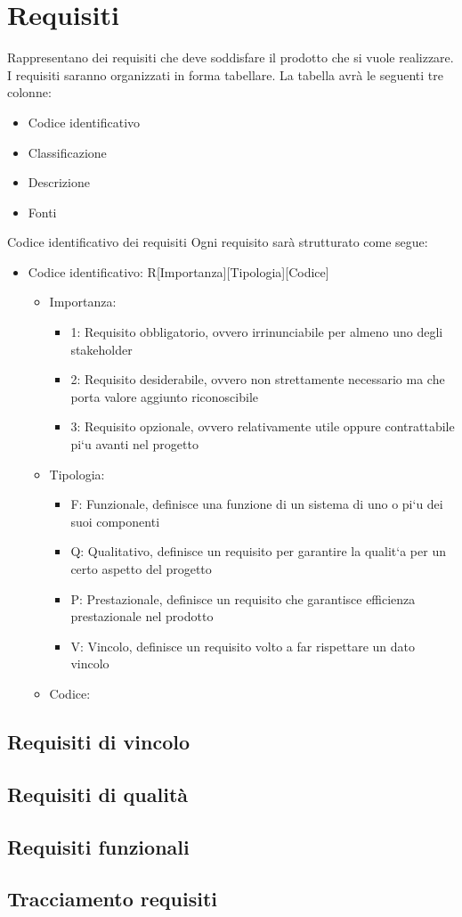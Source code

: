 \section{Requisiti}
    Rappresentano dei requisiti che deve soddisfare il prodotto che si vuole realizzare.
    I requisiti saranno organizzati in forma tabellare.
    La tabella avrà le seguenti tre colonne:
    \begin{itemize}
        \item Codice identificativo
        \item Classificazione
        \item Descrizione
        \item Fonti
    \end{itemize}
    Codice identificativo dei requisiti
    Ogni requisito sarà strutturato come segue:
    \begin{itemize}
        \item Codice identificativo: R[Importanza][Tipologia][Codice]
            \begin{itemize}
                \item Importanza: 
                    \begin{itemize}
                        \item 1: Requisito obbligatorio, ovvero irrinunciabile per almeno uno degli stakeholder
                        \item 2: Requisito desiderabile, ovvero non strettamente necessario ma che porta valore aggiunto
                        riconoscibile
                        \item 3: Requisito opzionale, ovvero relativamente utile oppure contrattabile pi`u avanti nel progetto
                    \end{itemize}
                \item Tipologia:
                    \begin{itemize}
                        \item F: Funzionale, definisce una funzione di un sistema di uno o pi`u dei suoi componenti
                        \item Q: Qualitativo, definisce un requisito per garantire la qualit`a per un certo aspetto del progetto
                        \item P: Prestazionale, definisce un requisito che garantisce efficienza prestazionale nel prodotto
                        \item V: Vincolo, definisce un requisito volto a far rispettare un dato vincolo
                    \end{itemize}
                \item Codice:
            \end{itemize}
    \end{itemize}
\subsection{Requisiti di vincolo}
\subsection{Requisiti di qualità}
\subsection{Requisiti funzionali}
\subsection{Tracciamento requisiti}